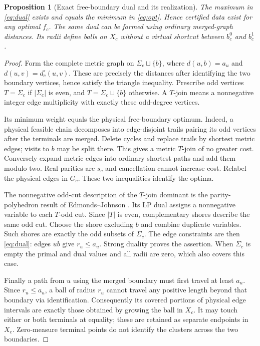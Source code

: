 \documentclass[11pt]{article}
\theoremstyle{definition}
\theoremstyle{plain}
\newtheorem{proposition}[definition]{Proposition}
\theoremstyle{remark}
\begin{document}
\begin{proposition}[Exact free-boundary dual and its realization]
\label{prop:dual}
The maximum in \eqref{eq:dual} exists and equals the minimum in
\eqref{eq:opt}. Hence certified data exist for any optimal $f_c$.
The same dual can be formed using ordinary merged-graph distances.
Its radii define balls on $X_c$ without a virtual shortcut between
$b_c^0$ and $b_c^1$.
\end{proposition}
\begin{proof}
Form the complete metric graph on $\Sigma_c\sqcup\{b\}$, where
$d(u,b)=a_u$ and $d(u,v)=d_c^\circ(u,v)$. These are precisely the
distances after identifying the two boundary vertices, hence satisfy
the triangle inequality. Prescribe odd vertices
$T=\Sigma_c$ if $|\Sigma_c|$ is even, and
$T=\Sigma_c\sqcup\{b\}$ otherwise.
A $T$-join means a nonnegative integer edge multiplicity with exactly
these odd-degree vertices.

Its minimum weight equals the physical free-boundary optimum.
Indeed, a physical feasible chain decomposes into edge-disjoint
trails pairing its odd vertices after the terminals are merged.
Delete cycles and replace trails by shortest metric edges; visits to
$b$ may be split there. This gives a metric $T$-join of no greater cost.
Conversely expand metric edges into ordinary shortest paths and add
them modulo two. Real parities are $s_c$ and cancellation cannot
increase cost. Relabel the physical edges in $G_c$. These two
inequalities identify the optima.

The nonnegative odd-cut description of the $T$-join dominant is the
parity-polyhedron result of Edmonds--Johnson
\cite[Sec.~3, pp.~93--95, Eqs.~(3.2), (3.5)--(3.8)]{EdmondsJohnson}.
Its LP dual assigns a nonnegative variable to each $T$-odd cut.
Since $|T|$ is even, complementary shores describe the same odd cut.
Choose the shore excluding $b$ and combine duplicate variables.
Such shores are exactly the odd subsets of $\Sigma_c$.
The edge constraints are then \eqref{eq:dual}: edges $ub$ give
$r_u\le a_u$. Strong duality proves the assertion.
When $\Sigma_c$ is empty the primal and dual values and all radii
are zero, which also covers this case.

Finally a path from $u$ using the merged boundary must first travel
at least $a_u$. Since $r_u\le a_u$, a ball of radius $r_u$ cannot
travel any positive length beyond that boundary via identification.
Consequently its covered portions of physical edge intervals are
exactly those obtained by growing the ball in $X_c$.
It may touch either or both terminals at equality; these are retained
as separate endpoints in $X_c$. Zero-measure terminal points do not
identify the clusters across the two boundaries.
\end{proof}
\end{document}
